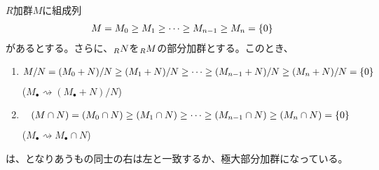 \documentclass[9pt]{ltjsarticle}
\begin{document}
$R$加群$M$に組成列
\begin{align}
  M = M_0 \ge M_1 \ge \dots \ge M_{n-1} \ge M_n = \{0\}
\end{align}
があるとする。さらに、${}_{R}N$を${}_{R}M$の部分加群とする。このとき、
\begin{enumerate}[label=(列\arabic*)]
  \item
  \begin{align}
    M/N = (M_0+N)/N \ge (M_1+N)/N \ge \dots \ge (M_{n-1}+N)/N \ge (M_n+N)/N = \{0\}
  \end{align}
  ($M_\bullet \rightsquigarrow (M_\bullet + N)/N$)
  \item
  \begin{align}
    (M\cap N) = (M_0 \cap N)  \ge (M_1 \cap N) \ge \dots \ge (M_{n-1} \cap N) \ge (M_n \cap N) = \{0\}
  \end{align}
  ($M_\bullet \rightsquigarrow M_\bullet \cap N$)
\end{enumerate}
は、となりあうもの同士の右は左と一致するか、極大部分加群になっている。
\end{document}
